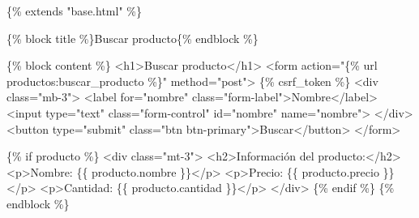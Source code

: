 \documentclass[
  a4paper,
  DIV=11,
  numbers=noendperiod,
  onepage,
  openany]{scrreprt}
\newenvironment{Shaded}{\begin{snugshade}}{\end{snugshade}}
\newcommand{\DataTypeTok}[1]{\textcolor[rgb]{0.68,0.00,0.00}{#1}}
\newcommand{\KeywordTok}[1]{\textcolor[rgb]{0.00,0.23,0.31}{#1}}
\newcommand{\NormalTok}[1]{\textcolor[rgb]{0.00,0.23,0.31}{#1}}
\newcommand{\OperatorTok}[1]{\textcolor[rgb]{0.37,0.37,0.37}{#1}}
\newcommand{\OtherTok}[1]{\textcolor[rgb]{0.00,0.23,0.31}{#1}}
\newcommand{\StringTok}[1]{\textcolor[rgb]{0.13,0.47,0.30}{#1}}
\begin{document}
\begin{Shaded}
\begin{Highlighting}[]
\NormalTok{\{\% extends "base.html" \%\}}

\NormalTok{\{\% block title \%\}Buscar producto\{\% endblock \%\}}

\NormalTok{\{\% block content \%\}}
\DataTypeTok{\textless{}}\KeywordTok{h1}\DataTypeTok{\textgreater{}}\NormalTok{Buscar producto}\DataTypeTok{\textless{}/}\KeywordTok{h1}\DataTypeTok{\textgreater{}}
\DataTypeTok{\textless{}}\KeywordTok{form}\OtherTok{ action}\OperatorTok{=}\StringTok{"\{\% url \textquotesingle{}productos:buscar\_producto\textquotesingle{} \%\}"}\OtherTok{ method}\OperatorTok{=}\StringTok{"post"}\DataTypeTok{\textgreater{}}
\NormalTok{    \{\% csrf\_token \%\}}
    \DataTypeTok{\textless{}}\KeywordTok{div}\OtherTok{ class}\OperatorTok{=}\StringTok{"mb{-}3"}\DataTypeTok{\textgreater{}}
        \DataTypeTok{\textless{}}\KeywordTok{label}\OtherTok{ for}\OperatorTok{=}\StringTok{"nombre"}\OtherTok{ class}\OperatorTok{=}\StringTok{"form{-}label"}\DataTypeTok{\textgreater{}}\NormalTok{Nombre}\DataTypeTok{\textless{}/}\KeywordTok{label}\DataTypeTok{\textgreater{}}
        \DataTypeTok{\textless{}}\KeywordTok{input}\OtherTok{ type}\OperatorTok{=}\StringTok{"text"}\OtherTok{ class}\OperatorTok{=}\StringTok{"form{-}control"}\OtherTok{ id}\OperatorTok{=}\StringTok{"nombre"}\OtherTok{ name}\OperatorTok{=}\StringTok{"nombre"}\DataTypeTok{\textgreater{}}
    \DataTypeTok{\textless{}/}\KeywordTok{div}\DataTypeTok{\textgreater{}}
    \DataTypeTok{\textless{}}\KeywordTok{button}\OtherTok{ type}\OperatorTok{=}\StringTok{"submit"}\OtherTok{ class}\OperatorTok{=}\StringTok{"btn btn{-}primary"}\DataTypeTok{\textgreater{}}\NormalTok{Buscar}\DataTypeTok{\textless{}/}\KeywordTok{button}\DataTypeTok{\textgreater{}}
\DataTypeTok{\textless{}/}\KeywordTok{form}\DataTypeTok{\textgreater{}}

\NormalTok{\{\% if producto \%\}}
\DataTypeTok{\textless{}}\KeywordTok{div}\OtherTok{ class}\OperatorTok{=}\StringTok{"mt{-}3"}\DataTypeTok{\textgreater{}}
    \DataTypeTok{\textless{}}\KeywordTok{h2}\DataTypeTok{\textgreater{}}\NormalTok{Información del producto:}\DataTypeTok{\textless{}/}\KeywordTok{h2}\DataTypeTok{\textgreater{}}
    \DataTypeTok{\textless{}}\KeywordTok{p}\DataTypeTok{\textgreater{}}\NormalTok{Nombre: \{\{ producto.nombre \}\}}\DataTypeTok{\textless{}/}\KeywordTok{p}\DataTypeTok{\textgreater{}}
    \DataTypeTok{\textless{}}\KeywordTok{p}\DataTypeTok{\textgreater{}}\NormalTok{Precio: \{\{ producto.precio \}\}}\DataTypeTok{\textless{}/}\KeywordTok{p}\DataTypeTok{\textgreater{}}
    \DataTypeTok{\textless{}}\KeywordTok{p}\DataTypeTok{\textgreater{}}\NormalTok{Cantidad: \{\{ producto.cantidad \}\}}\DataTypeTok{\textless{}/}\KeywordTok{p}\DataTypeTok{\textgreater{}}
\DataTypeTok{\textless{}/}\KeywordTok{div}\DataTypeTok{\textgreater{}}
\NormalTok{\{\% endif \%\}}
\NormalTok{\{\% endblock \%\}}
\end{Highlighting}
\end{Shaded}
\end{document}
